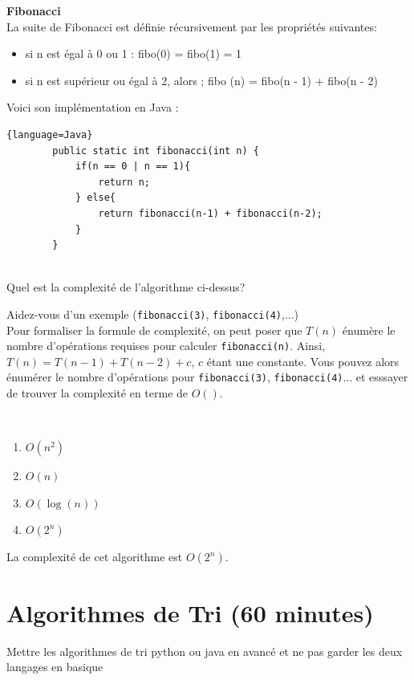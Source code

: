 \begin{Exercice} [10 minutes] \textbf{Fibonacci}\\
La suite de Fibonacci est définie récursivement par les propriétés suivantes:
\begin{itemize}
    \item si n est égal à 0 ou 1 : fibo(0) = fibo(1) = 1
    \item si n est supérieur ou égal à 2, alors ; fibo (n) = fibo(n - 1) + fibo(n - 2)
\end{itemize}

Voici son implémentation en Java :

\begin{lstlisting}{language=Java}
        public static int fibonacci(int n) {
            if(n == 0 | n == 1){
                return n;
            } else{
                return fibonacci(n-1) + fibonacci(n-2);
            }
        }
        
\end{lstlisting}

Quel est la complexité de l'algorithme ci-dessus?

\begin{conseil}
Aidez-vous d'un exemple (\lstinline{fibonacci(3)}, \lstinline{fibonacci(4)},...) \\
Pour formaliser la formule de complexité, on peut poser que $T(n)$ énumère le nombre d'opérations requises pour calculer \lstinline{fibonacci(n)}. Ainsi, $T(n) = T(n-1) + T(n-2) + c$, $c$ étant une constante. Vous pouvez alors énumérer le nombre d'opérations pour \lstinline{fibonacci(3)}, \lstinline{fibonacci(4)}... et esssayer de trouver la complexité en terme de $O()$.
\end{conseil}

\ \\

\begin{enumerate}
    \item $O(n^2)$
    \item $O(n)$
    \item $O(\log(n))$
    \item $O(2^n)$
\end{enumerate}

\begin{solution}
    La complexité de cet algorithme est $O(2^n)$.
\end{solution}
\end{Exercice}

\section{Algorithmes de Tri (60 minutes)}
 Mettre les algorithmes de tri python ou java en avancé et ne pas garder les deux langages en basique


